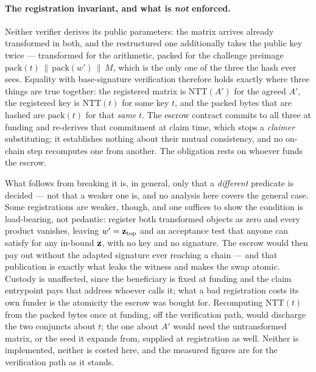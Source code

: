\paragraph{The registration invariant, and what is \emph{not} enforced.}
Neither verifier derives its public parameters: the matrix arrives already transformed in
both, and the restructured one additionally takes the public key twice --- transformed for
the arithmetic, packed for the challenge preimage
$\mathrm{pack}(t)\,\|\,\mathrm{pack}(w')\,\|\,M$, which is the only one of the three the
hash ever sees. Equality with base-signature verification therefore holds exactly where three
things are true together: the registered matrix is $\mathrm{NTT}(A')$ for the agreed $A'$,
the registered key is $\mathrm{NTT}(t)$ for some key $t$, and the packed bytes that are
hashed are $\mathrm{pack}(t)$ for that \emph{same} $t$. The escrow contract commits to all
three at funding and re-derives that commitment at claim time, which stops a \emph{claimer}
substituting; it establishes nothing about their mutual consistency, and no on-chain step
recomputes one from another. The obligation rests on whoever funds the escrow.

What follows from breaking it is, in general, only that a \emph{different} predicate is
decided --- not that a weaker one is, and no analysis here covers the general case. Some
registrations are weaker, though, and one suffices to show the condition is load-bearing, not pedantic: register both transformed objects as zero and every product
vanishes, leaving $w'=\mathbf{z}_{\mathrm{top}}$ and an acceptance test that anyone can satisfy
for any in-bound $\mathbf{z}$, with no key and no signature. The escrow would then pay out
without the adapted signature ever reaching a chain --- and that publication is exactly
what leaks the witness and makes the swap atomic. Custody is unaffected, since the
beneficiary is fixed at funding and the claim entrypoint pays that address whoever calls
it; what a bad registration costs its own funder is the atomicity the escrow was bought
for. Recomputing $\mathrm{NTT}(t)$ from the packed bytes once at funding, off the
verification path, would discharge the two conjuncts about $t$; the one about $A'$ would
need the untransformed matrix, or the seed it expands from, supplied at registration as
well. Neither is implemented, neither is costed here, and the measured figures are for the
verification path as it stands.

